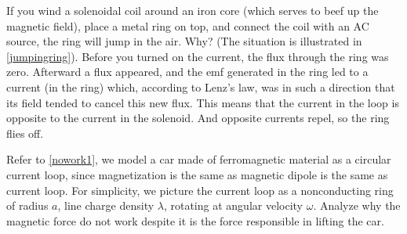 \documentclass[english,a4paper,12pt]{report}
\begin{document}
{If you wind a solenoidal coil around an iron core (which serves to beef up the magnetic field), place a metal ring on top, and connect the coil with an AC source, the ring will jump in the air. Why? (The situation is illustrated in \cref{jumpingring}).}
{Before you turned on the current, the flux through the ring was zero. Afterward a flux appeared, and the emf generated in the ring led to a current (in the ring) which, according to Lenz’s law, was in such a direction that its field tended to cancel this new flux. This means that the current in the loop is opposite to the current in the solenoid. And opposite currents repel, so the ring flies off.} 

{Refer to \cref{nowork1}, we model a car made of ferromagnetic material as a circular current loop, since magnetization is the same as magnetic dipole is the same as current loop. For simplicity, we picture the current loop as a nonconducting ring of radius \(a\), line charge density \(\lambda \), rotating at angular velocity \(\omega\). Analyze why the magnetic force do not work despite it is the force responsible in lifting the car.  }
\end{document}
